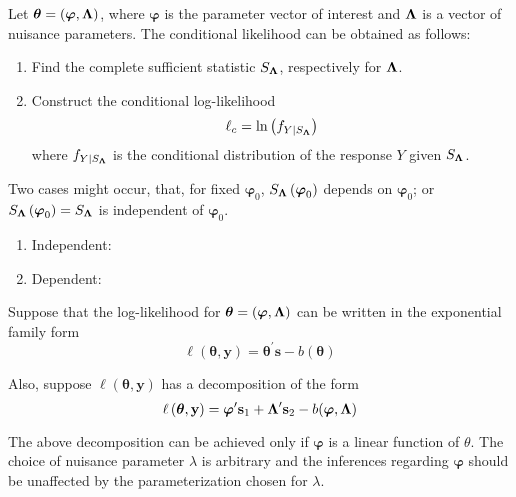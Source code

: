 Let \(\boldsymbol{\theta}=(\boldsymbol{\varphi},\boldsymbol{\Lambda})\), where \(\boldsymbol{\varphi}\) is the parameter vector of interest and \(\boldsymbol{\Lambda}\) is a vector of nuisance parameters. The conditional likelihood can be obtained as follows:
\begin{enumerate}
	\item Find the complete sufficient statistic \(S_{\boldsymbol{\Lambda}}\), respectively for \(\boldsymbol{\Lambda}\).
	\item  Construct the conditional log-likelihood
	      \begin{equation}
		      \ell_{c}=\ln\left(f_{Y\mid S_{\boldsymbol{\Lambda}}}\right)
	      \end{equation}
	      where \(f_{Y\mid S_{\boldsymbol{\Lambda}}}\) is the conditional distribution of the response \(Y\) given \(S_{\boldsymbol{\Lambda}}\).
\end{enumerate}

\begin{remark}
	Two cases might occur, that, for fixed \(\boldsymbol{\varphi}_{0}\), \(S_{\boldsymbol{\Lambda}}\left(\boldsymbol{\varphi}_{0}\right)\) depends on \(\boldsymbol{\varphi}_{0}\); or \(S_{\boldsymbol{\Lambda}}\left(\boldsymbol{\varphi}_{0}\right)=S_{\boldsymbol{\Lambda}}\) is independent of \(\boldsymbol{\varphi}_{0}\).
	\begin{enumerate}
		\item Independent:
		\item Dependent:
	\end{enumerate}
\end{remark}

Suppose that the log-likelihood for \(\boldsymbol{\theta}=\left(\boldsymbol{\varphi},\boldsymbol{\Lambda}\right)\) can be written in the exponential family form
\begin{equation}
	\ell\left(\boldsymbol{\theta},\mathbf{y}\right)=\boldsymbol{\theta}^{\prime}\mathbf{s}-b\left(\boldsymbol{\theta}\right)
\end{equation}

Also, suppose \(\ell\left(\boldsymbol{\theta},\mathbf{y}\right)\) has a decomposition of the form
\begin{equation}
	\ell\left(\boldsymbol{\theta},\mathbf{y}\right)=\boldsymbol{\varphi}^{\prime}\mathbf{s}_{1}+\boldsymbol{\Lambda}^{\prime}\mathbf{s}_{2}-b(\boldsymbol{\varphi},\boldsymbol{\Lambda})
\end{equation}

\begin{remark}
	The above decomposition can be achieved only if \(\boldsymbol{\varphi}\) is a linear function of \(\theta\). The choice of nuisance parameter \(\lambda\) is arbitrary and the inferences regarding \(\boldsymbol{\varphi}\) should be unaffected by the parameterization chosen for \(\lambda\).
\end{remark}

